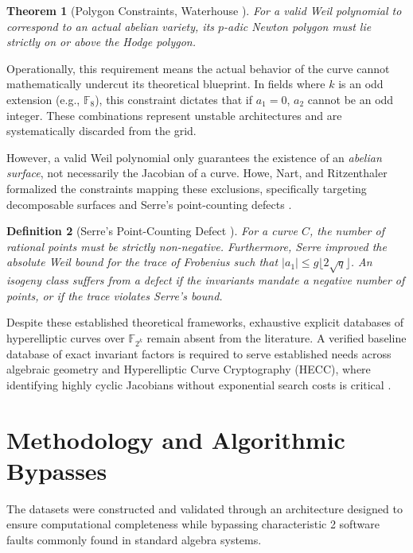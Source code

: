 \documentclass[11pt,letterpaper]{article}
\newtheorem{theorem}{Theorem}[section]
\newtheorem{definition}[theorem]{Definition}
\begin{document}
\begin{theorem}[Polygon Constraints, Waterhouse \cite{Waterhouse1969}]
For a valid Weil polynomial to correspond to an actual abelian variety, its $p$-adic Newton polygon must lie strictly on or above the Hodge polygon.
\end{theorem}

Operationally, this requirement means the actual behavior of the curve cannot mathematically undercut its theoretical blueprint. In fields where $k$ is an odd extension (e.g., $\mathbb{F}_8$), this constraint dictates that if $a_1 = 0$, $a_2$ cannot be an odd integer. These combinations represent unstable architectures and are systematically discarded from the grid.

However, a valid Weil polynomial only guarantees the existence of an \textit{abelian surface}, not necessarily the Jacobian of a curve. Howe, Nart, and Ritzenthaler formalized the constraints mapping these exclusions, specifically targeting decomposable surfaces and Serre's point-counting defects \cite{Howe2009}. 

\begin{definition}[Serre's Point-Counting Defect \cite{Serre1983}]
For a curve $C$, the number of rational points must be strictly non-negative. Furthermore, Serre improved the absolute Weil bound for the trace of Frobenius such that $|a_1| \le g \lfloor 2\sqrt{q} \rfloor$. An isogeny class suffers from a defect if the invariants mandate a negative number of points, or if the trace violates Serre's bound.
\end{definition}

Despite these established theoretical frameworks, exhaustive explicit databases of hyperelliptic curves over $\mathbb{F}_{2^k}$ remain absent from the literature. A verified baseline database of exact invariant factors is required to serve established needs across algebraic geometry and Hyperelliptic Curve Cryptography (HECC), where identifying highly cyclic Jacobians without exponential search costs is critical \cite{Satoh2008}.

\section{Methodology and Algorithmic Bypasses}
The datasets were constructed and validated through an architecture designed to ensure computational completeness while bypassing characteristic 2 software faults commonly found in standard algebra systems. 
\end{document}
